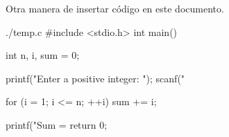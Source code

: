 \documentclass[spanish,11pt,twoside]{article}
\begin{document}
\newpage
Otra manera de insertar código en este documento.

\begin{verbatimwrite}{./temp.c}
	#include <stdio.h>
	int main() {
		int n, i, sum = 0;
		
		printf("Enter a positive integer: ");
		scanf("%
		
		for (i = 1; i <= n; ++i) {
			sum += i;
		}
		
		printf("Sum = %
		return 0;
	}
\end{verbatimwrite}
\begin{mdframed}[backgroundcolor=clr-background,topline=true,bottomline=true,leftline=false,rightline=false,innerleftmargin=\leftskip, innertopmargin=0pt]
	
\end{mdframed}





\renewcommand{\refname}{Bibliografía} %



\nocite{battistutti2005metodologia} %
\nocite{*} %

\end{document}
